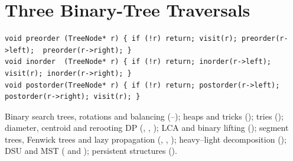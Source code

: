 \section{Three Binary-Tree Traversals}

\begin{lstlisting}[caption={Preorder, inorder, postorder in one recursive pass (Chapter 3)}, label={lst:app-traversals}]
void preorder (TreeNode* r) { if (!r) return; visit(r); preorder(r->left);  preorder(r->right); }
void inorder  (TreeNode* r) { if (!r) return; inorder(r->left);  visit(r); inorder(r->right); }
void postorder(TreeNode* r) { if (!r) return; postorder(r->left); postorder(r->right); visit(r); }
\end{lstlisting}

\begin{notebox}
Binary search trees, rotations and balancing (--); heaps and
 tricks (); tries (); diameter, centroid and
rerooting DP (, , ); LCA and binary lifting (); segment
trees, Fenwick trees and lazy propagation (, , ); heavy--light
decomposition (); DSU and MST ( and ); persistent structures
().
\end{notebox}
